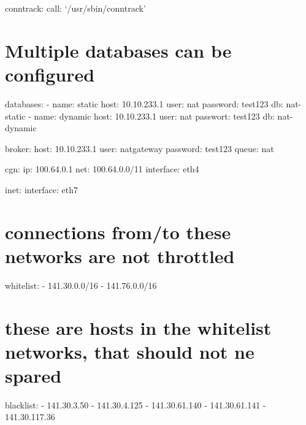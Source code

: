 conntrack: call: `/usr/sbin/conntrack'

\section{Multiple databases can be
configured}\label{multiple-databases-can-be-configured}

databases: - name: static host: 10.10.233.1 user: nat password: test123
db: nat-static - name: dynamic host: 10.10.233.1 user: nat passwort:
test123 db: nat-dynamic

broker: host: 10.10.233.1 user: natgateway password: test123 queue: nat

cgn: ip: 100.64.0.1 net: 100.64.0.0/11 interface: eth4

inet: interface: eth7

\section{connections from/to these networks are not
throttled}\label{connections-fromto-these-networks-are-not-throttled}

whitelist: - 141.30.0.0/16 - 141.76.0.0/16

\section{these are hosts in the whitelist networks, that should not ne
spared}\label{these-are-hosts-in-the-whitelist-networks-that-should-not-ne-spared}

blacklist: - 141.30.3.50 - 141.30.4.125 - 141.30.61.140 - 141.30.61.141
- 141.30.117.36
